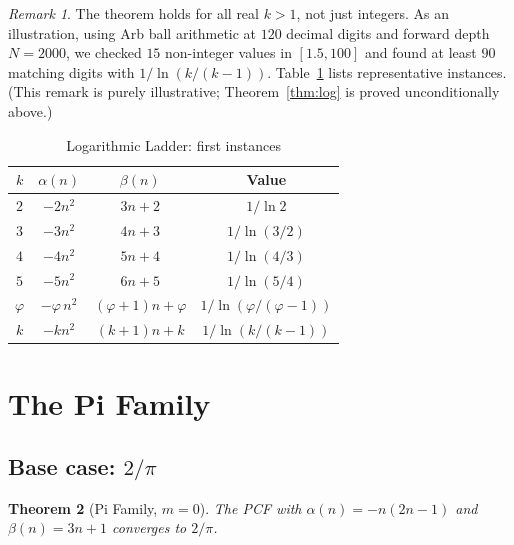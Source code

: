 \documentclass[11pt,a4paper]{article}
\theoremstyle{plain}
\newtheorem{theorem}{Theorem}[section]
\theoremstyle{definition}
\theoremstyle{remark}
\newtheorem{remark}[theorem]{Remark}
\begin{document}
\begin{remark}
The theorem holds for all real $k > 1$, not just integers.
As an illustration, using Arb ball arithmetic at $120$ decimal digits
and forward depth $N=2000$, we checked $15$ non-integer values in
$[1.5,100]$ and found at least $90$ matching digits with
$1/\ln(k/(k{-}1))$.
Table~\ref{tab:log} lists representative instances.
(This remark is purely illustrative; Theorem~\ref{thm:log} is proved
unconditionally above.)
\end{remark}

\begin{table}[ht]
\centering
\caption{Logarithmic Ladder: first instances}\label{tab:log}
\begin{tabular}{@{}cccc@{}}
\toprule
$k$ & $\alpha(n)$ & $\beta(n)$ & Value \\
\midrule
$2$ & $-2n^2$ & $3n+2$ & $1/\ln 2$ \\
$3$ & $-3n^2$ & $4n+3$ & $1/\ln(3/2)$ \\
$4$ & $-4n^2$ & $5n+4$ & $1/\ln(4/3)$ \\
$5$ & $-5n^2$ & $6n+5$ & $1/\ln(5/4)$ \\
$\varphi$ & $-\varphi\, n^2$ & $(\varphi{+}1)n{+}\varphi$ &
  $1/\ln(\varphi/(\varphi{-}1))$ \\
$k$ & $-kn^2$ & $(k{+}1)n{+}k$ & $1/\ln(k/(k{-}1))$ \\
\bottomrule
\end{tabular}
\end{table}

\section{The Pi Family}\label{sec:pi}

\subsection{Base case: \texorpdfstring{$2/\pi$}{2/pi}}\label{sec:pi_base}

\begin{theorem}[Pi Family, $m=0$]\label{thm:pi0}
The PCF with $\alpha(n) = -n(2n{-}1)$ and $\beta(n) = 3n+1$
converges to $2/\pi$.
\end{theorem}
\end{document}
